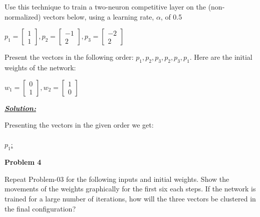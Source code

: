 \documentclass{article}
\begin{document}
\noindent Use this technique to train a two-neuron competitive layer on the (non-normalized) 
vectors below, using a learning rate, $\alpha$, of 0.5 

\begin{center}
    $p_1 = \begin{bmatrix}
        1\\
        1
      \end{bmatrix}, p_2 = \begin{bmatrix}
        -1\\
        2
      \end{bmatrix}, p_3 = \begin{bmatrix}
        -2 \\
        2
      \end{bmatrix}$
\end{center}

\noindent Present the vectors in the following order: $p_1, p_2, p_3, p_2, p_3, p_1$. 
Here are the initial weights of the network: 

\begin{center}
    $w_1 = \begin{bmatrix}
        0\\
        1
      \end{bmatrix}, w_2 = \begin{bmatrix}
        1\\
        0
      \end{bmatrix}$
      \vspace{1cm}
\end{center}

\noindent \underline{\textbf{\textit{Solution:}}}

\noindent Presenting the vectors in the given order we get: \\\\ \underline{$p_1$:}


\newpage
\noindent \textbf{Problem 4}

\noindent Repeat Problem-03 for the following inputs and initial weights. Show the movements of 
the weights graphically for the first six each steps. If the network is trained for a large 
number of iterations, how will the three vectors be clustered in the final configuration?
\end{document}
